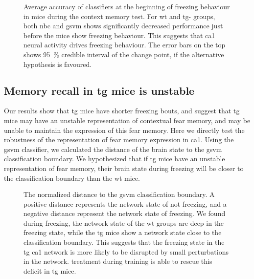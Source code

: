 \begin{figure}[h]
    \begin{subfigure}[h]{\textwidth}
        
        \caption{\label{f.ad.nb_into_f}}
    \end{subfigure}
    \begin{subfigure}[h]{\textwidth}
        
        \caption{\label{f.ad.svm_into_f}}
    \end{subfigure}
    \caption[Average classifier prediction accuracy at initiation of freezing behaviour.]{Average accuracy of classifiers at the beginning of freezing behaviour in mice during the context memory test. For \gls{wt} and \gls{tg}-\glu{} groups, both \gls{nbc} and \gls{gsvm} shows significantly decreased performance just before the mice show freezing behaviour. This suggests that \gls{ca1} neural activity drives freezing behaviour. The error bars on the top shows \SI{95}{\percent} credible interval of the change point, if the alternative hypothesis is favoured. \label{f.ad.into_f}}
\end{figure}

\subsection{Memory recall in \gls{tg} mice is unstable}
Our results show that \gls{tg} mice have shorter freezing bouts, and suggest that \gls{tg} mice may have an unstable representation of contextual fear memory, and may be unable to maintain the expression of this fear memory. Here we directly test the robustness of the representation of fear memory expression in \gls{ca1}. Using the \gls{gsvm} classifier, we calculated the distance of the brain state to the \gls{gsvm} classification boundary. We hypothesized that if \gls{tg} mice have an unstable representation of fear memory, their brain state during freezing will be closer to the classification boundary than the \gls{wt} mice. 

\begin{figure}[h]
    
    \caption[Normalized distance to the \gls{gsvm} classification boundary.]{The normalized distance to the \gls{gsvm} classification boundary. A positive distance represents the network state of not freezing, and a negative distance represent the network state of freezing. We found during freezing, the network state of the \gls{wt} groups are deep in the freezing state, while the \gls{tg} mice show a network state close to the classification boundary. This suggests that the freezing state in the \gls{tg} \gls{ca1} network is more likely to be disrupted by small perturbations in the network. \tglu{} treatment during training is able to rescue this deficit in \gls{tg} mice. \label{f.ad.cls-distance}}
\end{figure}

